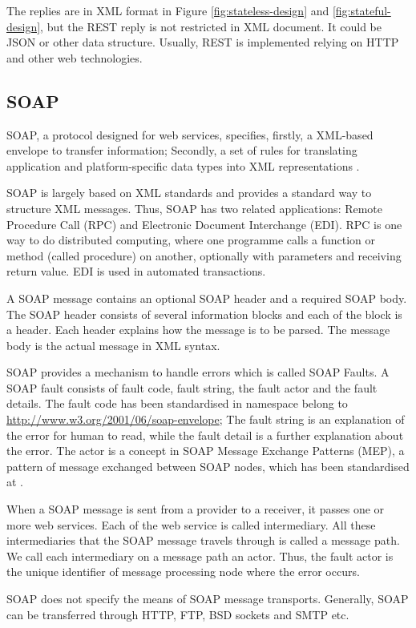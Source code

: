 The replies are in XML format in Figure \ref{fig:stateless-design} and \ref{fig:stateful-design}, but the REST reply is not restricted in XML document. It could be JSON or other data structure. Usually, REST is implemented relying on HTTP and other web technologies. 

\subsection{SOAP}
SOAP, a protocol designed for web services, specifies, firstly, a XML-based envelope to transfer information; Secondly, a set of rules for translating application and platform-specific data types into XML representations \cite{snell2009programming}. 

SOAP is largely based on XML standards and provides a standard way to structure XML messages. Thus, SOAP has two related applications: Remote Procedure Call (RPC) and Electronic Document Interchange (EDI). RPC is one way to do distributed computing, where one programme calls a function or method (called procedure) on another, optionally with parameters and receiving return value. EDI is used in automated transactions.

A SOAP message contains an optional SOAP header and a required SOAP body. The SOAP header consists of several information blocks and each of the block is a header. Each header explains how the message is to be parsed. The message body is the actual message in XML syntax. 

SOAP provides a mechanism to handle errors which is called SOAP Faults. A SOAP fault consists of fault code, fault string, the fault actor and the fault details. The fault code has been standardised in namespace belong to \url{http://www.w3.org/2001/06/soap-envelope}; The fault string is an explanation of the error for human to read, while the fault detail is a further explanation about the error. The actor is a concept in SOAP Message Exchange Patterns (MEP), a pattern of message exchanged between SOAP nodes, which has been standardised at \cite{booth2007web}.

When a SOAP message is sent from a provider to a receiver, it passes one or more web services. Each of the web service is called intermediary. All these intermediaries that the SOAP message travels through is called a message path. We call each intermediary on a message path an actor. Thus, the fault actor is the unique identifier of message processing node where the error occurs. 

SOAP does not specify the means of SOAP message transports. Generally, SOAP can be transferred through HTTP, FTP, BSD sockets and SMTP etc. 

